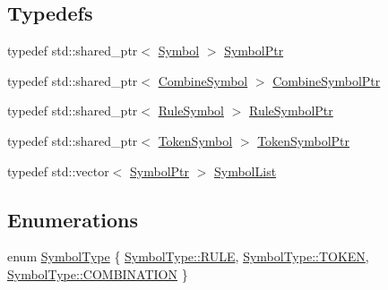 \subsection*{Typedefs}
\begin{DoxyCompactItemize}
\item 
typedef std\+::shared\+\_\+ptr$<$ \mbox{\hyperlink{class_erable_1_1_compiler_1_1_symbols_1_1_symbol}{Symbol}} $>$ \mbox{\hyperlink{namespace_erable_1_1_compiler_1_1_symbols_a8f0bc762f448ea4d84e8713ab3e140b9}{Symbol\+Ptr}}
\item 
typedef std\+::shared\+\_\+ptr$<$ \mbox{\hyperlink{struct_erable_1_1_compiler_1_1_symbols_1_1_combine_symbol}{Combine\+Symbol}} $>$ \mbox{\hyperlink{namespace_erable_1_1_compiler_1_1_symbols_ad3326e636860b0452468de51ed673c8a}{Combine\+Symbol\+Ptr}}
\item 
typedef std\+::shared\+\_\+ptr$<$ \mbox{\hyperlink{class_erable_1_1_compiler_1_1_symbols_1_1_rule_symbol}{Rule\+Symbol}} $>$ \mbox{\hyperlink{namespace_erable_1_1_compiler_1_1_symbols_ad8082e934d2afbff2d9c8b1e77069e20}{Rule\+Symbol\+Ptr}}
\item 
typedef std\+::shared\+\_\+ptr$<$ \mbox{\hyperlink{class_erable_1_1_compiler_1_1_symbols_1_1_token_symbol}{Token\+Symbol}} $>$ \mbox{\hyperlink{namespace_erable_1_1_compiler_1_1_symbols_a901387d440ee00c2282850e615ff8ffa}{Token\+Symbol\+Ptr}}
\item 
typedef std\+::vector$<$ \mbox{\hyperlink{namespace_erable_1_1_compiler_1_1_symbols_a8f0bc762f448ea4d84e8713ab3e140b9}{Symbol\+Ptr}} $>$ \mbox{\hyperlink{namespace_erable_1_1_compiler_1_1_symbols_a63e8157d2f729d4689d27bacad42f8ed}{Symbol\+List}}
\end{DoxyCompactItemize}
\subsection*{Enumerations}
\begin{DoxyCompactItemize}
\item 
enum \mbox{\hyperlink{namespace_erable_1_1_compiler_1_1_symbols_a3b60ec10cda0920ec4368128361b8320}{Symbol\+Type}} \{ \mbox{\hyperlink{namespace_erable_1_1_compiler_1_1_symbols_a3b60ec10cda0920ec4368128361b8320a2dfa0f84a44043dca0cd209721123afa}{Symbol\+Type\+::\+R\+U\+LE}}, 
\mbox{\hyperlink{namespace_erable_1_1_compiler_1_1_symbols_a3b60ec10cda0920ec4368128361b8320a94c8aa2452bccd82ee129b46f7c4be79}{Symbol\+Type\+::\+T\+O\+K\+EN}}, 
\mbox{\hyperlink{namespace_erable_1_1_compiler_1_1_symbols_a3b60ec10cda0920ec4368128361b8320a45b476684f4bd61fc6bba89a63c15696}{Symbol\+Type\+::\+C\+O\+M\+B\+I\+N\+A\+T\+I\+ON}}
 \}
\end{DoxyCompactItemize}


